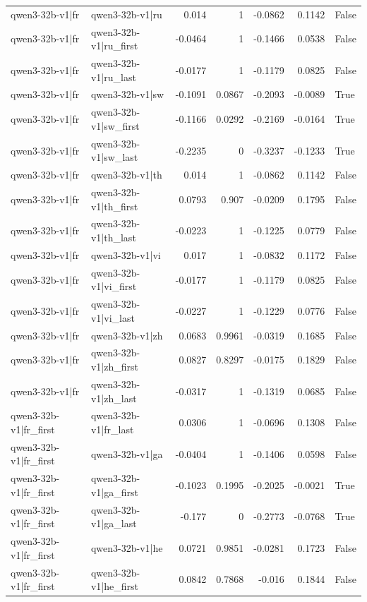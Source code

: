 \begin{table}
\begin{tabular}{l l r r r r l}
qwen3-32b-v1|fr & qwen3-32b-v1|ru & 0.014 & 1 & -0.0862 & 0.1142 & False \\
qwen3-32b-v1|fr & qwen3-32b-v1|ru_first & -0.0464 & 1 & -0.1466 & 0.0538 & False \\
qwen3-32b-v1|fr & qwen3-32b-v1|ru_last & -0.0177 & 1 & -0.1179 & 0.0825 & False \\
qwen3-32b-v1|fr & qwen3-32b-v1|sw & -0.1091 & 0.0867 & -0.2093 & -0.0089 & True \\
qwen3-32b-v1|fr & qwen3-32b-v1|sw_first & -0.1166 & 0.0292 & -0.2169 & -0.0164 & True \\
qwen3-32b-v1|fr & qwen3-32b-v1|sw_last & -0.2235 & 0 & -0.3237 & -0.1233 & True \\
qwen3-32b-v1|fr & qwen3-32b-v1|th & 0.014 & 1 & -0.0862 & 0.1142 & False \\
qwen3-32b-v1|fr & qwen3-32b-v1|th_first & 0.0793 & 0.907 & -0.0209 & 0.1795 & False \\
qwen3-32b-v1|fr & qwen3-32b-v1|th_last & -0.0223 & 1 & -0.1225 & 0.0779 & False \\
qwen3-32b-v1|fr & qwen3-32b-v1|vi & 0.017 & 1 & -0.0832 & 0.1172 & False \\
qwen3-32b-v1|fr & qwen3-32b-v1|vi_first & -0.0177 & 1 & -0.1179 & 0.0825 & False \\
qwen3-32b-v1|fr & qwen3-32b-v1|vi_last & -0.0227 & 1 & -0.1229 & 0.0776 & False \\
qwen3-32b-v1|fr & qwen3-32b-v1|zh & 0.0683 & 0.9961 & -0.0319 & 0.1685 & False \\
qwen3-32b-v1|fr & qwen3-32b-v1|zh_first & 0.0827 & 0.8297 & -0.0175 & 0.1829 & False \\
qwen3-32b-v1|fr & qwen3-32b-v1|zh_last & -0.0317 & 1 & -0.1319 & 0.0685 & False \\
qwen3-32b-v1|fr_first & qwen3-32b-v1|fr_last & 0.0306 & 1 & -0.0696 & 0.1308 & False \\
qwen3-32b-v1|fr_first & qwen3-32b-v1|ga & -0.0404 & 1 & -0.1406 & 0.0598 & False \\
qwen3-32b-v1|fr_first & qwen3-32b-v1|ga_first & -0.1023 & 0.1995 & -0.2025 & -0.0021 & True \\
qwen3-32b-v1|fr_first & qwen3-32b-v1|ga_last & -0.177 & 0 & -0.2773 & -0.0768 & True \\
qwen3-32b-v1|fr_first & qwen3-32b-v1|he & 0.0721 & 0.9851 & -0.0281 & 0.1723 & False \\
qwen3-32b-v1|fr_first & qwen3-32b-v1|he_first & 0.0842 & 0.7868 & -0.016 & 0.1844 & False \\

\end{tabular}
\end{table}
